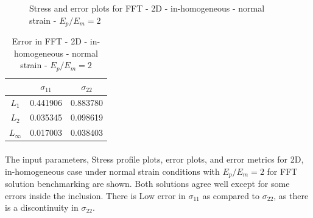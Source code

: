 \documentclass[12pt, a4paper]{report}
\begin{document}
\begin{figure}[htbp]
  \centering
  \hfill
  \caption{Stress and error plots for FFT - 2D - in-homogeneous - normal strain - $E_p / E_m = 2$}
\end{figure}

\begin{table}[H]
    \centering
    \begin{tabular}{|c|c|c|}
        \hline
        &\textbf{$\sigma_{11}$} &  \textbf{$\sigma_{22}$} \\
        \hline
        $L_1$ & 0.441906 & 0.883780 \\
        \hline
        $L_2$ & 0.035345 & 0.098619 \\
        \hline 
        $L_\infty$ & 0.017003 & 0.038403 \\
        \hline
    \end{tabular}
    \caption{Error in FFT - 2D - in-homogeneous - normal strain - $E_p / E_m = 2$}
\end{table}

\paragraph{}
The input parameters, Stress profile plots, error plots, and error metrics for 2D, in-homogeneous case under normal strain conditions with $E_p / E_m = 2$ for FFT solution benchmarking are shown. Both solutions agree well except for some errors inside the inclusion. There is Low error in $\sigma_{11}$ as compared to $\sigma_{22}$, as there is a discontinuity in $\sigma_{22}$.
\end{document}
